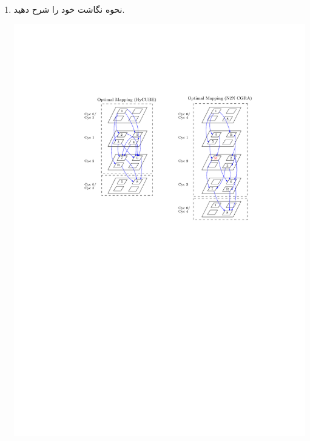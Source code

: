 \begin{enumerate}
	\item نحوه نگاشت خود را شرح دهید.
	\begin{qsolve}
		\begin{center}
			\includegraphics*[width=1\linewidth]{pics/Q2.pdf}
			\label{Optimal Mapping}
		\end{center}
	\end{qsolve}
\end{enumerate}



